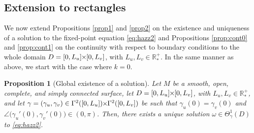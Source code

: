 \documentclass{article}
\newcommand{\PLH}{{\mkern-1mu\times\mkern-1mu}}
\newcommand{\Times}{\PLH}
\newcommand{\R}{\mathbb{R}}
\newcommand{\surf}{M}
\newtheorem{proposition}[theorem]{Proposition}
\theoremstyle{remark}
\theoremstyle{prpart}
\begin{document}
\subsection{Extension to rectangles}\label{sec:extension}
We now extend Propositions \ref{prop1} and \ref{prop2} on the existence and uniqueness of a solution to the fixed-point equation \eqref{eq:hazz2} and Propositions \ref{prop:cont0} and \ref{prop:cont1} on the continuity with respect to boundary conditions to the whole domain $D=[0,L_u]\Times [0,L_v]$, with $L_u,L_v\in\R^+_\ast$. In the same manner as above, we start with the case where $k=0$. 
\begin{proposition}[Global existence of a solution] \label{prop3}
  Let $\surf$ be a smooth, open, complete, and simply connected surface, let $D=[0,L_u]\Times[0,L_v]$, with $L_u,L_v\in\R^+_\ast$, and let $\gamma=(\gamma_u,\gamma_v) \in \Gamma^{2}([0,L_u])\Times\Gamma^{2}([0,L_v])$ be such that $\gamma_u(0)=\gamma_v(0)$ and $\angle\big(\gamma_u'(0),\gamma_v'(0)\big)\in(0,\pi)$. Then, there exists a unique solution $\omega \in \Theta^{1}_{\gamma}(D)$ to \eqref{eq:hazz2}.
\end{proposition}
\end{document}
